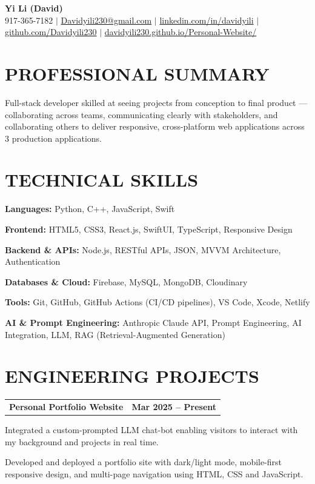 \documentclass[letterpaper,10pt]{article}
\makeatletter
\newcommand{\rItem}[1]{\item\small\color{darknavy} #1}
\newcommand{\entryHeadNoSub}[2]{%
  \vspace{2pt}%
  \begin{tabular*}{\textwidth}[t]{l@{\extracolsep{\fill}}r}
    \textbf{\color{darknavy}#1} & \textbf{\small\color{darkgray}#2}\\
  \end{tabular*}\vspace{2pt}%
}
\newcommand{\skillRow}[2]{%
  \vspace{2pt}\small\textbf{\color{darknavy}#1:} \color{darknavy}#2\par%
}
\makeatother
\begin{document}
\begin{center}
  {\huge\bfseries\color{darknavy} Yi Li (David)}\\[4pt]
  \small\color{darkgray}
  917-365-7182 \;$|$\;
  \href{mailto:Davidyili230@gmail.com}{Davidyili230@gmail.com} \;$|$\;
  \href{https://linkedin.com/in/davidyili}{linkedin.com/in/davidyili} \;$|$\;
  \href{https://github.com/Davidyili230}{github.com/Davidyili230} \;$|$\;
  \href{https://davidyili230.github.io/Personal-Website/}{davidyili230.github.io/Personal-Website/}
\end{center}
\vspace{-10pt}

\section{PROFESSIONAL SUMMARY}
Full-stack developer skilled at seeing projects from conception to final product — collaborating across teams, communicating clearly with stakeholders, and collaborating others to deliver responsive, cross-platform web applications across 3 production applications.
\vspace{0pt}

\section{TECHNICAL SKILLS}
\skillRow{Languages}{Python, C++, JavaScript, Swift}
\skillRow{Frontend}{HTML5, CSS3, React.js, SwiftUI, TypeScript, Responsive Design}
\skillRow{Backend \& APIs}{Node.js, RESTful APIs, JSON, MVVM Architecture, Authentication}
\skillRow{Databases \& Cloud}{Firebase, MySQL, MongoDB, Cloudinary}
\skillRow{Tools}{Git, GitHub, GitHub Actions (CI/CD pipelines), VS Code, Xcode, Netlify}
\skillRow{AI \& Prompt Engineering}{Anthropic Claude API, Prompt Engineering, AI Integration, LLM, RAG (Retrieval-Augmented Generation)}
\vspace{0pt}

\section{ENGINEERING PROJECTS}

\entryHeadNoSub{Personal Portfolio Website}{Mar 2025 -- Present}
\begin{resumebullets}
  \rItem{Integrated a custom-prompted LLM chat-bot enabling visitors to interact with my background and projects in real time.}
  \rItem{Developed and deployed a portfolio site with dark/light mode, mobile-first responsive design, and multi-page navigation using HTML, CSS and JavaScript.}
\end{resumebullets}
\end{document}
